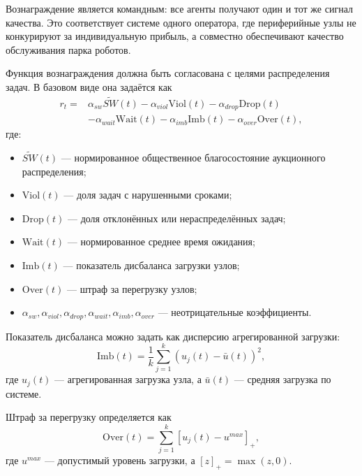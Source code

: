 Вознаграждение является командным: все агенты получают один и тот же сигнал качества. Это соответствует системе одного оператора, где периферийные узлы не конкурируют за индивидуальную прибыль, а совместно обеспечивают качество обслуживания парка роботов.

Функция вознаграждения должна быть согласована с целями распределения задач. В базовом виде она задаётся как
\begin{equation}
    \begin{aligned}
    r_t ={}& \alpha_{sw}\widetilde{SW}(t)
    - \alpha_{viol}\mathrm{Viol}(t)
    - \alpha_{drop}\mathrm{Drop}(t) \\
    &- \alpha_{wait}\mathrm{Wait}(t)
    - \alpha_{imb}\mathrm{Imb}(t)
    - \alpha_{over}\mathrm{Over}(t),
    \end{aligned}
    \label{eq:ch4_reward}
\end{equation}
где:
\begin{itemize}
    \item $\widetilde{SW}(t)$ --- нормированное общественное благосостояние аукционного распределения;
    \item $\mathrm{Viol}(t)$ --- доля задач с нарушенными сроками;
    \item $\mathrm{Drop}(t)$ --- доля отклонённых или нераспределённых задач;
    \item $\mathrm{Wait}(t)$ --- нормированное среднее время ожидания;
    \item $\mathrm{Imb}(t)$ --- показатель дисбаланса загрузки узлов;
    \item $\mathrm{Over}(t)$ --- штраф за перегрузку узлов;
    \item $\alpha_{sw},\alpha_{viol},\alpha_{drop},\alpha_{wait},\alpha_{imb},\alpha_{over}$ --- неотрицательные коэффициенты.
\end{itemize}

Показатель дисбаланса можно задать как дисперсию агрегированной загрузки:
\begin{equation}
    \mathrm{Imb}(t)
    =
    \frac{1}{k}
    \sum_{j=1}^{k}
    \left(
        u_j(t)-\bar{u}(t)
    \right)^2,
    \label{eq:ch4_imbalance}
\end{equation}
где $u_j(t)$ --- агрегированная загрузка узла, а $\bar{u}(t)$ --- средняя загрузка по системе.

Штраф за перегрузку определяется как
\begin{equation}
    \mathrm{Over}(t)
    =
    \sum_{j=1}^{k}
    \left[
        u_j(t)-u^{max}
    \right]_+,
    \label{eq:ch4_overload}
\end{equation}
где $u^{max}$ --- допустимый уровень загрузки, а $[z]_+=\max(z,0)$.

